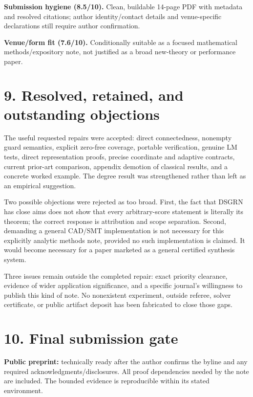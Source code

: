 \documentclass[
  11pt,
]{article}
\begin{document}
\textbf{Submission hygiene (8.5/10).} Clean, buildable 14-page PDF with
metadata and resolved citations; author identity/contact details and
venue-specific declarations still require author confirmation.

\textbf{Venue/form fit (7.6/10).} Conditionally suitable as a focused
mathematical methods/expository note, not justified as a broad
new-theory or performance paper.

\section{9. Resolved, retained, and outstanding
objections}\label{resolved-retained-and-outstanding-objections}

The useful requested repairs were accepted: direct connectedness,
nonempty guard semantics, explicit zero-free coverage, portable
verification, genuine LM tests, direct representation proofs, precise
coordinate and adaptive contracts, current prior-art comparison,
appendix demotion of classical results, and a concrete worked example.
The degree result was strengthened rather than left as an empirical
suggestion.

Two possible objections were rejected as too broad. First, the fact that
DSGRN has close aims does not show that every arbitrary-score statement
is literally its theorem; the correct response is attribution and scope
separation. Second, demanding a general CAD/SMT implementation is not
necessary for this explicitly analytic methods note, provided no such
implementation is claimed. It would become necessary for a paper
marketed as a general certified synthesis system.

Three issues remain outside the completed repair: exact priority
clearance, evidence of wider application significance, and a specific
journal's willingness to publish this kind of note. No nonexistent
experiment, outside referee, solver certificate, or public artifact
deposit has been fabricated to close those gaps.

\section{10. Final submission gate}\label{final-submission-gate}

\textbf{Public preprint:} technically ready after the author confirms
the byline and any required acknowledgments/disclosures. All proof
dependencies needed by the note are included. The bounded evidence is
reproducible within its stated environment.
\end{document}
